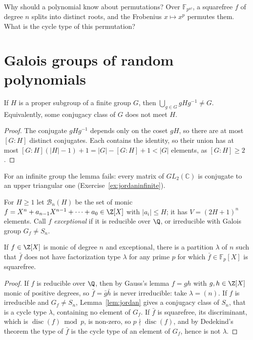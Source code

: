 \begin{think}
Why should a polynomial know about permutations? Over $\mathbb F_{p^{n!}}$, a squarefree $f$ of degree $n$ splits into distinct roots, and the Frobenius $x\mapsto x^p$ permutes them. What is the cycle type of this permutation?
\end{think}

\section{Galois groups of random polynomials}

\begin{lemma}[Jordan, 1872]\label{lem:jordan}
If $H$ is a proper subgroup of a finite group $G$, then $\bigcup_{g\in G}gHg^{-1}\ne G$. Equivalently, some conjugacy class of $G$ does not meet $H$.
\end{lemma}
\begin{proof}
The conjugate $gHg^{-1}$ depends only on the coset $gH$, so there are at most $[G:H]$ distinct conjugates. Each contains the identity, so their union has at most $[G:H](|H|-1)+1=|G|-[G:H]+1<|G|$ elements, as $[G:H]\ge2$.
\end{proof}

For an infinite group the lemma fails: every matrix of $GL_2(\mathbb C)$ is conjugate to an upper triangular one (Exercise~\ref{ex:jordaninfinite}).

For $H\ge1$ let $\mathcal B_n(H)$ be the set of monic $f=X^n+a_{n-1}X^{n-1}+\dots+a_0\in\Z[X]$ with $|a_i|\le H$; it has $V=(2H+1)^n$ elements. Call $f$ \emph{exceptional} if it is reducible over $\Q$, or irreducible with Galois group $G_f\ne S_n$.

\begin{lemma}\label{lem:missingtype}
If $f\in\Z[X]$ is monic of degree $n$ and exceptional, there is a partition $\lambda$ of $n$ such that $\bar f$ does not have factorization type $\lambda$ for any prime $p$ for which $\bar f\in\mathbb F_p[X]$ is squarefree.
\end{lemma}
\begin{proof}
If $f$ is reducible over $\Q$, then by Gauss's lemma $f=gh$ with $g,h\in\Z[X]$ monic of positive degrees, so $\bar f=\bar g\bar h$ is never irreducible: take $\lambda=(n)$. If $f$ is irreducible and $G_f\ne S_n$, Lemma~\ref{lem:jordan} gives a conjugacy class of $S_n$, that is a cycle type $\lambda$, containing no element of $G_f$. If $\bar f$ is squarefree, its discriminant, which is $\operatorname{disc}(f)\bmod p$, is non-zero, so $p\nmid\operatorname{disc}(f)$, and by Dedekind's theorem the type of $\bar f$ is the cycle type of an element of $G_f$, hence is not $\lambda$.
\end{proof}

